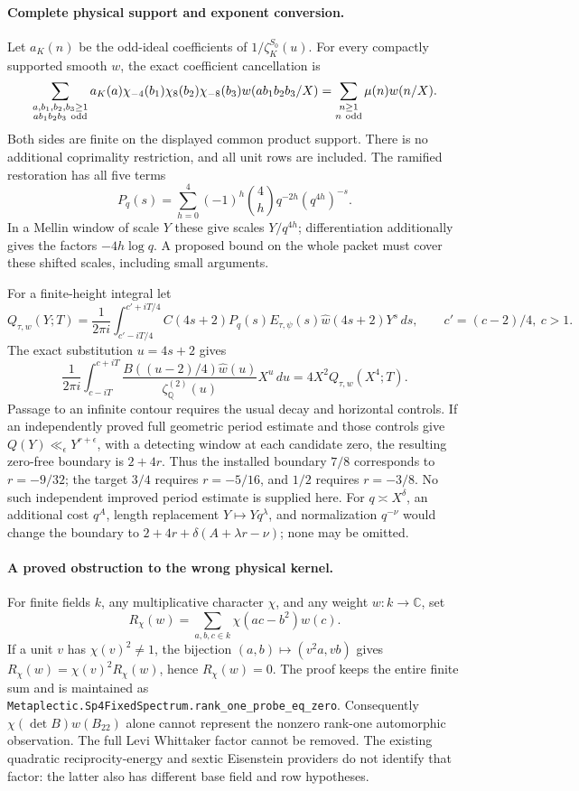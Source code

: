 \paragraph{Complete physical support and exponent conversion.}
Let \(a_K(n)\) be the odd-ideal coefficients of
\(1/\zeta_K^{S_0}(u)\). For every compactly supported smooth \(w\),
the exact coefficient cancellation is
\[
 \sum_{\substack{a,b_1,b_2,b_3\ge1\\ab_1b_2b_3\ {\rm odd}}}
 a_K(a)\chi_{-4}(b_1)\chi_8(b_2)\chi_{-8}(b_3)
       w(ab_1b_2b_3/X)
 =\sum_{\substack{n\ge1\\n\ {\rm odd}}}\mu(n)w(n/X).
\]
Both sides are finite on the displayed common product support.
There is no additional coprimality restriction, and all unit rows
are included. The ramified restoration has all five terms
\[
 P_q(s)=\sum_{h=0}^{4}(-1)^h\binom4h q^{-2h}(q^{4h})^{-s}.
\]
In a Mellin window of scale \(Y\) these give scales
\(Y/q^{4h}\); differentiation additionally gives the factors
\(-4h\log q\). A proposed bound on the whole packet must cover
these shifted scales, including small arguments.

For a finite-height integral let
\[
 Q_{\tau,w}(Y;T)=\frac1{2\pi i}
  \int_{c'-iT/4}^{c'+iT/4}
    C(4s+2)P_q(s)E_{\tau,\psi}(s)
    \widehat w(4s+2)Y^s\,ds,
 \qquad c'=(c-2)/4,\ c>1.
\]
The exact substitution \(u=4s+2\) gives
\[
 \frac1{2\pi i}\int_{c-iT}^{c+iT}
    \frac{B((u-2)/4)\widehat w(u)}{\zeta_{\mathbb Q}^{(2)}(u)}
       X^u\,du
       =4X^2 Q_{\tau,w}(X^4;T).
\]
Passage to an infinite contour requires the usual decay and horizontal
controls. If an independently proved full geometric period estimate
and those controls give \(Q(Y)\ll_\epsilon Y^{r+\epsilon}\),
with a detecting window at each candidate zero, the resulting
zero-free boundary is \(2+4r\). Thus the installed boundary \(7/8\)
corresponds to \(r=-9/32\); the target \(3/4\) requires
\(r=-5/16\), and \(1/2\) requires \(r=-3/8\).
No such independent improved period estimate is supplied here.
For \(q\asymp X^\delta\), an additional cost \(q^A\), length
replacement \(Y\mapsto Yq^\lambda\), and normalization \(q^{-\nu}\)
would change the boundary to
\(2+4r+\delta(A+\lambda r-\nu)\); none may be omitted.

\paragraph{A proved obstruction to the wrong physical kernel.}
For finite fields \(k\), any multiplicative character \(\chi\),
and any weight \(w:k\to\mathbb C\), set
\[
 R_\chi(w)=\sum_{a,b,c\in k}\chi(ac-b^2)w(c).
\]
If a unit \(v\) has \(\chi(v)^2\ne1\), the bijection
\((a,b)\mapsto(v^2a,vb)\) gives
\(R_\chi(w)=\chi(v)^2R_\chi(w)\), hence \(R_\chi(w)=0\).
The proof keeps the entire finite sum and is maintained as
\texttt{Metaplectic.Sp4FixedSpectrum.rank\_one\_probe\_eq\_zero}.
Consequently \(\chi(\det B)w(B_{22})\) alone cannot represent the
nonzero rank-one automorphic observation. The full Levi Whittaker
factor cannot be removed. The existing quadratic reciprocity-energy
and sextic Eisenstein providers do not identify that factor: the
latter also has different base field and row hypotheses.

